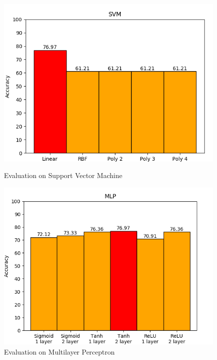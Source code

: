 \documentclass[a4paper,oneside]{article}
\begin{document}
\begin{figure}[h]
	\centering
	\begin{minipage}[t]{8.6cm}
\includegraphics[width=1\linewidth]{SVM}
  \centering
  \caption{Evaluation on Support Vector Machine}
  \label{fig:SVM}
	\end{minipage}
	\begin{minipage}[t]{8.6cm}
	\includegraphics[width=1\linewidth]{MLP}
  \centering
  \caption{Evaluation on Multilayer Perceptron}
  \label{fig:MLP}
	\end{minipage}
\end{figure}
\end{document}
